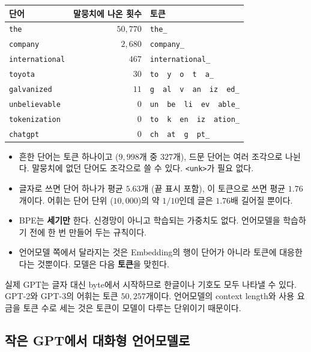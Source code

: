 \documentclass[11pt,a4paper]{article}
\newcommand{\w}[1]{\texttt{#1}}
\begin{document}
\begin{center}
\begin{tabular}{@{}lrl@{}}
\toprule
단어 & 말뭉치에 나온 횟수 & 토큰 \\
\midrule
\w{the} & $50{,}770$ & \w{the\_} \\
\w{company} & $2{,}680$ & \w{company\_} \\
\w{international} & $467$ & \w{international\_} \\
\w{toyota} & $30$ & \w{to}\ \ \w{y}\ \ \w{o}\ \ \w{t}\ \ \w{a\_} \\
\w{galvanized} & $11$ & \w{g}\ \ \w{al}\ \ \w{v}\ \ \w{an}\ \ \w{iz}\ \ \w{ed\_} \\
\w{unbelievable} & $0$ & \w{un}\ \ \w{be}\ \ \w{li}\ \ \w{ev}\ \ \w{able\_} \\
\w{tokenization} & $0$ & \w{to}\ \ \w{k}\ \ \w{en}\ \ \w{iz}\ \ \w{ation\_} \\
\w{chatgpt} & $0$ & \w{ch}\ \ \w{at}\ \ \w{g}\ \ \w{pt\_} \\
\bottomrule
\end{tabular}
\end{center}

\begin{itemize}[leftmargin=1.5em]
\item 흔한 단어는 토큰 하나이고 ($9{,}998$개 중 $327$개), 드문 단어는 여러 조각으로 나뉜다. 말뭉치에 없던 단어도 조각으로 쓸 수 있다. \w{<unk>}가 필요 없다.
\item 글자로 쓰면 단어 하나가 평균 $5.63$개 (끝 표시 포함), 이 토큰으로 쓰면 평균 $1.76$개이다. 어휘는 단어 단위 ($10{,}000$)의 약 $1/10$인데 글은 $1.76$배 길어질 뿐이다.
\item BPE는 \textbf{세기만} 한다. 신경망이 아니고 학습되는 가중치도 없다. 언어모델을 학습하기 전에 한 번 만들어 두는 규칙이다.
\item 언어모델 쪽에서 달라지는 것은 Embedding의 행이 단어가 아니라 토큰에 대응한다는 것뿐이다. 모델은 다음 \textbf{토큰}을 맞힌다.
\end{itemize}

실제 GPT는 글자 대신 byte에서 시작하므로 한글이나 기호도 모두 나타낼 수 있다. GPT-2와 GPT-3의 어휘는 토큰 $50{,}257$개이다.
언어모델의 context length와 사용 요금을 토큰 수로 세는 것은 토큰이 모델이 다루는 단위이기 때문이다.

\subsection{작은 GPT에서 대화형 언어모델로}
\end{document}
